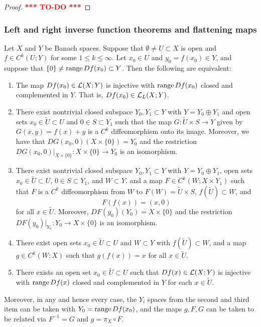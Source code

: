 \documentclass[a4paper]{article}
\newcommand{\TODO}{\textcolor{red}{\textbf{*** TO-DO ***}}}
\begin{document}
\begin{proof}
\TODO
\end{proof}

\subsubsection{Left and right inverse function theorems and 
flattening maps}

\begin{thm}
Let $X$ and $Y$ be Banach spaces. Suppose that $\emptyset \neq U
\subset X$ is open and $f \in C^k(U; Y)$ for some $1 \leq k \leq
\infty$. Let $x_0 \in U$ and $y_0 = f(x_0) \in Y$, and suppose
that $\{0\} \neq \operatorname{range} Df(x_0) \subset Y$. Then the
following are equivalent:
\begin{enumerate}
\item The map $Df(x_0) \in \mathcal{L}(X; Y)$ is injective with $\operatorname{range}
Df(x_0)$ closed and complemented in $Y$. That is, $Df(x_0)
\in \mathcal{L}_L(X; Y)$.

\item There exist nontrivial closed subspace $Y_0, Y_1
\subset Y$ with $Y = Y_0 \oplus Y_1$ and open sets $x_0
\in \tilde{U} \subset U$ and $0 \in S \subset Y_1$ such that
the map $G : \tilde{U} \times S \to Y$ given by $G(x, y)
= f(x) + y$ is a $C^k$ diffeomorphism onto its image.
Moreover, we have that $DG(x_0, 0) (X \times \{0\}) = Y_0$
and the restriction $DG(x_0, 0) \vert_{X \times \{0\}}
: X \times \{0\} \to Y_0$ is an isomorphism.

\item There exist nontrivial closed subspace $Y_0, Y_1
\subset Y$ with $Y = Y_0 \oplus Y_1$, open sets $x_0 \in \tilde{U}
\subset U$, $0 \in S \subset Y_1$, and $W \subset Y$.
and a map $F \in C^k(W ; X \times Y_1)$ such that $F$
is a $C^k$ diffeomorphism from $W$ to $F(W) = \tilde{U}
\times S$, $f(\tilde{U}) \subset W$, and
\[
F(f(x)) = (x, 0)
\]
for all $x \in \tilde{U}$. Moreover, $DF(y_0) (Y_0) = X \times
\{0\}$ and the restriction $DF(y_0) \vert_{Y_0} : Y_0
\to X \times \{0\}$ is an isomorphism.

\item There exist open sets $x_0 \in \tilde{U} \subset U$
and $W \subset Y$ with $f(\tilde{U}) \subset W$, and a map
$g \in C^k(W ; X)$ such that $g(f(x)) = x$ for all $x \in
\tilde{U}$.

\item There exists an open set $x_0 \in \tilde{U} \subset U$
such that $Df(x) \in \mathcal{L}(X; Y)$ is injective with
$\operatorname{range} Df(x)$ closed and complemented in $Y$ for each
$x \in \tilde{U}$.
\end{enumerate}

Moreover, in any and hence every case, the $Y_i$ spaces
from the second and third item can be taken with $Y_0
= \operatorname{range} Df(x_0)$, and the maps $g, F, G$ can be taken to be related
via $F^{-1} = G$ and $g = \pi_X \circ F$.
\end{thm}
\end{document}
